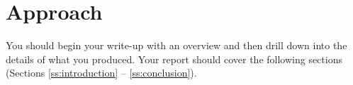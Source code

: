 \section{Approach}

You should begin your write-up with an overview and then drill down
into the details of what you produced. Your report should cover the
following sections (Sections \ref{ss:introduction} --
\ref{ss:conclusion}).
